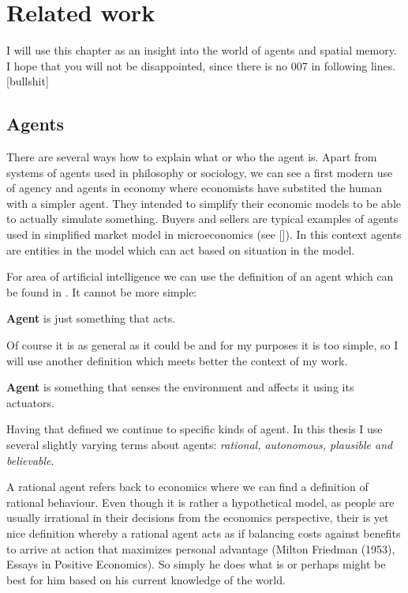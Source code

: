 \chapter{Related work}

I will use this chapter as an insight into the world of agents and spatial memory. I hope that you will not be disappointed, since there is no 007 in following lines. [bullshit]

\section{Agents}

There are several ways how to explain what or who the agent is. Apart from systems of agents used in philosophy or sociology, we can see a first modern use of agency and agents in economy where economists have substited the human with a simpler agent. They intended to simplify their economic models to be able to actually simulate something. Buyers and sellers are typical examples of agents used in simplified market model in microeconomics (see []). In this context agents are entities in the model which can act based on situation in the model.

For area of artificial intelligence we can use the definition of an agent which can be found in \cite{russel2003ai}. It cannot be more simple:

\begin{definition}{\bf Agent} is just something that acts.
\end{definition} 

Of course it is as general as it could be and for my purposes it is too simple, so I will use another definition which meets better the context of my work.

\begin{definition}{\bf Agent} is something that senses the environment and affects it using its actuators.
\end{definition} 

Having that defined we continue to specific kinds of agent. In this thesis I use several slightly varying terms about agents: \emph{rational, autonomous, plausible and believable}. 

A rational agent refers back to economics where we can find a definition of rational behaviour. Even though it is rather a hypothetical model, as people are usually irrational in their decisions from the economics perspective, their is yet nice definition whereby a rational agent acts as if balancing costs against benefits to arrive at action that maximizes personal advantage (Milton Friedman (1953), Essays in Positive Economics). So simply he does what is or perhaps might be best for him based on his current knowledge of the world.
 
